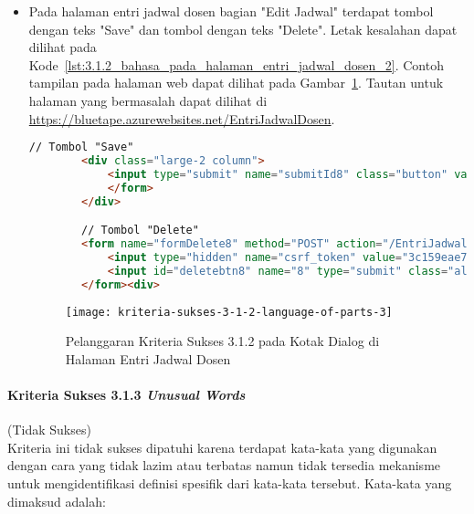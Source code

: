 \begin{itemize}
    \item Pada halaman entri jadwal dosen bagian "Edit Jadwal" terdapat tombol dengan teks "Save" dan tombol dengan teks "Delete". Letak kesalahan dapat dilihat pada \mbox{Kode \ref{lst:3.1.2_bahasa_pada_halaman_entri_jadwal_dosen_2}}. Contoh tampilan pada halaman web dapat dilihat pada \mbox{Gambar \ref{fig:3.1.2_language_of_parts_3}}. Tautan untuk halaman yang bermasalah dapat dilihat di \url{https://bluetape.azurewebsites.net/EntriJadwalDosen}.
    \begin{lstlisting}[frame=single, label={lst:3.1.2_bahasa_pada_halaman_entri_jadwal_dosen_2}, language=HTML, caption=Pelanggaran Kriteria Sukses 3.1.2 pada Kotak Dialog di Halaman Entri Jadwal Dosen]
        // Tombol "Save"
        <div class="large-2 column">
            <input type="submit" name="submitId8" class="button" value="Save">
            </form>
        </div>

        // Tombol "Delete"
        <form name="formDelete8" method="POST" action="/EntriJadwalDosen/delete/8">    
            <input type="hidden" name="csrf_token" value="3c159eae7bc953dd591b679c080ed066"/>
            <input id="deletebtn8" name="8" type="submit" class="alert button" value="Delete">
        </form><div>
    \end{lstlisting}
    
    \begin{figure}[H]
        \centering  
        \texttt{[image: kriteria-sukses-3-1-2-language-of-parts-3]}  
        \caption[Pelanggaran Kriteria Sukses 3.1.2 pada Kotak Dialog di Halaman Entri Jadwal Dosen]{Pelanggaran Kriteria Sukses 3.1.2 pada Kotak Dialog di Halaman Entri Jadwal Dosen}
        \label{fig:3.1.2_language_of_parts_3}  
    \end{figure}
\end{itemize}

\paragraph{Kriteria Sukses 3.1.3 \textit{Unusual Words}}
\label{par:kepatuhan_bluetape_kriteria_sukses_3.1.3}
(Tidak Sukses)\\

Kriteria ini tidak sukses dipatuhi karena terdapat kata-kata yang digunakan dengan cara yang tidak lazim atau terbatas namun tidak tersedia mekanisme untuk mengidentifikasi definisi spesifik dari kata-kata tersebut. Kata-kata yang dimaksud adalah:

